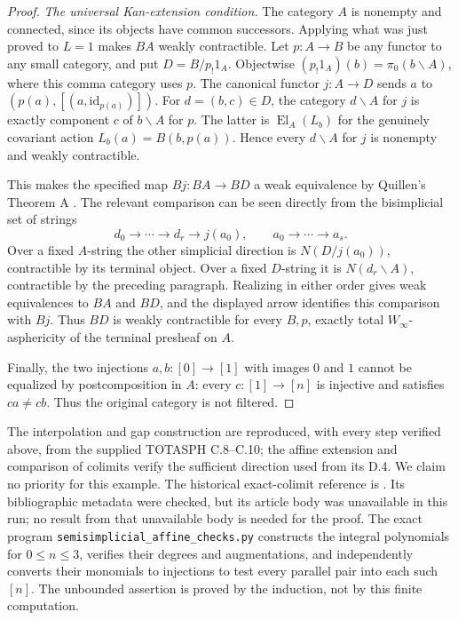 \documentclass[11pt,a4paper]{article}
\theoremstyle{definition}
\theoremstyle{remark}
\newcommand{\id}{\mathrm{id}}
\newcommand{\Winfty}{W_\infty}
\newcommand{\El}{\operatorname{El}}
\begin{document}
\begin{proof}
\emph{The universal Kan-extension condition.}
The category $A$ is nonempty and connected, since its objects
have common successors.  Applying what was just proved to
$L=1$ makes $BA$ weakly contractible.  Let $p:A\to B$ be any
functor to any small category, and put $D=B/p_!1_A$.
Objectwise $(p_!1_A)(b)=\pi_0(b\backslash A)$, where this
comma category uses $p$.  The canonical functor $j:A\to D$
sends $a$ to $(p(a),[(a,\id_{p(a)})])$.  For $d=(b,c)\in D$,
the category $d\backslash A$ for $j$ is exactly component $c$
of $b\backslash A$ for $p$.  The latter is
$\El_A(L_b)$ for the genuinely covariant action
$L_b(a)=B(b,p(a))$.  Hence every $d\backslash A$ for $j$ is
nonempty and weakly contractible.

This makes the specified map $Bj:BA\to BD$ a weak equivalence
by Quillen's Theorem A \citep[Section 1, Theorem A]{Quillen1973}.
The relevant comparison can be seen directly from the
bisimplicial set of strings
\[
 d_0\to\cdots\to d_r\to j(a_0),\qquad
 a_0\to\cdots\to a_s.
\]
Over a fixed $A$-string the other simplicial direction is
$N(D/j(a_0))$, contractible by its terminal object.  Over a
fixed $D$-string it is $N(d_r\backslash A)$, contractible by
the preceding paragraph.  Realizing in either order gives
weak equivalences to $BA$ and $BD$, and the displayed arrow
identifies this comparison with $Bj$.  Thus $BD$ is weakly
contractible for every $B,p$, exactly total $\Winfty$-asphericity
of the terminal presheaf on $A$.

Finally, the two injections $a,b:[0]\to[1]$ with images $0$
and $1$ cannot be equalized by postcomposition in $A$: every
$c:[1]\to[n]$ is injective and satisfies $ca\ne cb$.
Thus the original category is not filtered.
\end{proof}

The interpolation and gap construction are reproduced, with every
step verified above, from the supplied TOTASPH C.8--C.10; the
affine extension and comparison of colimits verify the sufficient
direction used from its D.4.  We claim no priority for this example.
The historical exact-colimit reference is
\citet{IsbellMitchell1973}.  Its bibliographic metadata were
checked, but its article body was unavailable in this run; no result
from that unavailable body is needed for the proof.  The exact
program \texttt{semisimplicial\_affine\_checks.py} constructs the
integral polynomials for $0\leq n\leq3$, verifies their degrees
and augmentations, and independently converts their monomials to
injections to test every parallel pair into each such $[n]$.
The unbounded assertion is proved by the induction, not by this
finite computation.
\end{document}
